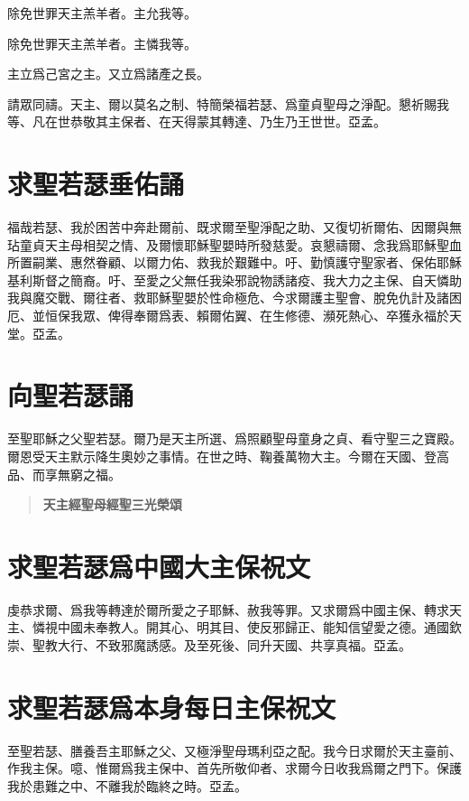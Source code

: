 \versicle 除免世罪天主羔羊者。\hfill \response 主允我等。

\versicle 除免世罪天主羔羊者。\hfill \response 主憐我等。

\versicle 主立爲己宮之主。\hfill \response 又立爲諸產之長。

\versicle 請眾同禱。{\cspace}天主、爾以莫名之制、特簡榮福若瑟、爲童貞聖母之淨配。懇祈賜我等、凡在世恭敬其主保者、在天得蒙其轉達、乃生乃王世世。{\cspace}亞孟。

\section*{求聖若瑟垂佑誦}
福哉若瑟、我於困苦中奔赴爾前、既求爾至聖淨配之助、又復切祈爾佑、因爾與無玷童貞天主母相契之情、及爾懷耶穌聖嬰時所發慈愛。哀懇禱爾、念我爲耶穌聖血所置嗣業、惠然眷顧、以爾力佑、救我於艱難中。吁、勤慎護守聖家者、保佑耶穌基利斯督之簡裔。吁、至愛之父無任我染邪說物誘諸疫、我大力之主保、自天憐助我與魔交戰、爾往者、救耶穌聖嬰於性命極危、今求爾護主聖會、脫免仇計及諸困厄、並恒保我眾、俾得奉爾爲表、賴爾佑翼、在生修德、瀕死熱心、卒獲永福於天堂。{\cspace}亞孟。

\section*{向聖若瑟誦}
至聖耶穌之父聖若瑟。爾乃是天主所選、爲照顧聖母童身之貞、看守聖三之寶殿。爾恩受天主默示降生奧妙之事情。在世之時、鞠養萬物大主。今爾在天國、登高品、而享無窮之福。

\begin{quote}\bfseries 天主經\quad 聖母經\quad 聖三光榮頌\end{quote}

\section*{求聖若瑟爲中國大主保祝文}
虔恭求爾、爲我等轉達於爾所愛之子耶穌、赦我等罪。又求爾爲中國主保、轉求天主、憐視中國未奉教人。開其心、明其目、使反邪歸正、能知信望愛之德。通國欽崇、聖教大行、不致邪魔誘感。及至死後、同升天國、共享真福。{\cspace}亞孟。

\section*{求聖若瑟爲本身每日主保祝文}
至聖若瑟、膳養吾主耶穌之父、又極淨聖母瑪利亞之配。我今日求爾於天主臺前、作我主保。噫、惟爾爲我主保中、首先所敬仰者、求爾今日收我爲爾之門下。保護我於患難之中、不離我於臨終之時。{\cspace}亞孟。
